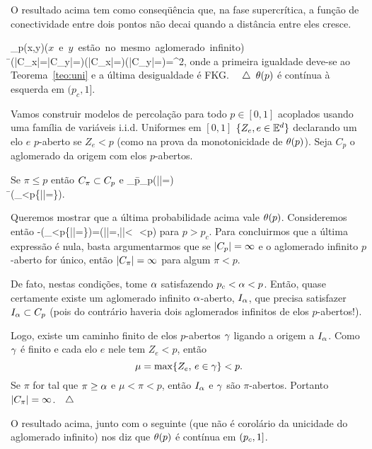 \vs

O resultado acima tem como conseqüência que, na fase supercrítica,
a função de conectividade entre
dois pontos não decai quando a distância entre eles cresce.

\vs


\beqnn
\tau_p(x,y)\ge\p(\mbox{$x$ e $y$ estão no mesmo aglomerado infinito})\\
\=\p(|C_x|=|C_y|=\infty)\geq\p(|C_x|=\infty)\p(|C_y|=\infty)=\tep^2,
\eeqnn
onde a primeira igualdade deve-se ao Teorema~\ref{teo:uni} e a última
desigualdade é FKG. $\quad\triangle$
\bco
$\theta(p)$ é contínua à esquerda em $(p_c,1]$.
\eco


Vamos construir modelos de percolação para todo $p\in[0,1]$ acoplados
usando uma família de variáveis i.i.d. Uniformes em $[0,1]$ 
$\{Z_e, e\in\mathbb{E}^d\}$ declarando um elo $e$ $p$-aberto se $Z_e<p$
(como na prova da monotonicidade de $\theta(p)$). Seja $C_p$ o aglomerado 
da origem com elos $p$-abertos.

Se $\pi\leq p$ então $C_\pi\subset C_p$ e
\beqnn
\lim_{\pi\ua p}\tepi\=\lim_{\pi\ua p}\pp(|\cpi|=\infty)\\
\=\pp(\cup_{\pi<p}\{|\cpi|=\infty\}).
\eeqnn

Queremos mostrar que a última probabilidade acima vale $\theta(p)$.
Consideremos então
\beq
\tep-\pp(\cup_{\pi<p}\{|\cpi|=\infty\})=\pp(|\cp|=\infty,|\cpi|<\infty\,
\forall\,\pi<p)
\eeq
para $p>p_c$. 
Para concluirmos que a última expressão é nula, basta argumentarmos que 
se $|C_p|=\infty$ e o aglomerado infinito $p$-aberto for único, então
$|C_\pi|=\infty$ para algum $\pi<p$. 

De fato, nestas condições, tome $\alpha$ satisfazendo $p_c<\alpha<p$. Então,
quase certamente existe um aglomerado infinito $\alpha$-aberto, $I_{\alpha}$, que
precisa satisfazer $I_{\alpha}\subset C_p$ (pois do contrário haveria dois aglomerados
infinitos de elos $p$-abertos!). 

Logo, existe um caminho finito de elos $p$-abertos $\gamma$ ligando a origem a
$I_{\alpha}$. Como $\gamma$ é finito e cada elo $e$ nele tem $Z_e<p$, então
$$\mu=\max\{Z_e,\,e\in\gamma\}<p.$$ Se $\pi$ for tal que
$\pi\geq\alpha$ e $\mu<\pi<p$, então $I_{\alpha}$ e $\gamma$ são $\pi$-abertos.
Portanto $|C_\pi|=\infty$.$\quad\triangle$

\vspace{.5cm}

O resultado acima, junto com o seguinte (que não é corolário da unicidade do
aglomerado infinito) nos diz que $\theta(p)$ é contínua em $(p_c,1]$.

